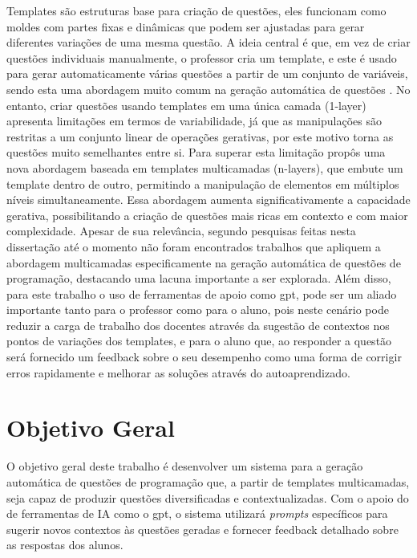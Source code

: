 Templates são estruturas base para criação de questões, eles funcionam como moldes com partes fixas e dinâmicas que podem ser ajustadas para gerar diferentes variações de uma mesma questão. A ideia central é que, em vez de criar questões individuais manualmente, o professor cria um template, e este é usado para gerar automaticamente várias questões a partir de um conjunto de variáveis, sendo esta uma abordagem muito comum na geração automática de questões \parencite{zavala2018}.  No entanto, criar questões usando templates em uma única camada (1-layer) apresenta limitações em termos de variabilidade, já que as manipulações são restritas a um conjunto linear de operações gerativas, por  este motivo torna as questões muito semelhantes entre si. Para superar esta limitação \parencite{lai2013} propôs uma nova abordagem baseada em templates multicamadas (n-layers), que embute um template dentro de outro, permitindo a manipulação de elementos em múltiplos níveis simultaneamente. Essa abordagem aumenta significativamente a capacidade gerativa, possibilitando a criação de questões mais ricas em contexto e com maior complexidade. Apesar de sua relevância, segundo pesquisas feitas nesta dissertação até o momento não foram encontrados trabalhos que apliquem a abordagem multicamadas especificamente na geração automática de questões de programação, destacando uma lacuna importante a ser explorada. Além disso, para este trabalho o uso de ferramentas de apoio como  \gls{gpt}, pode ser um aliado importante tanto para o professor como para o aluno, pois neste cenário pode reduzir a carga de trabalho dos docentes através da sugestão de contextos nos pontos de variações dos templates, e para o aluno que, ao responder a questão será fornecido um feedback  sobre o seu desempenho como uma forma de corrigir erros rapidamente e melhorar as soluções através do autoaprendizado.

\section{Objetivo Geral}

O objetivo geral deste trabalho é desenvolver um sistema para a geração automática de questões de programação que, a partir de templates multicamadas, seja capaz de produzir questões diversificadas e contextualizadas. Com o apoio do de ferramentas de IA como o \gls{gpt}, o sistema utilizará \textit{prompts} específicos para sugerir novos contextos às questões geradas e fornecer feedback detalhado  sobre as respostas dos alunos.

